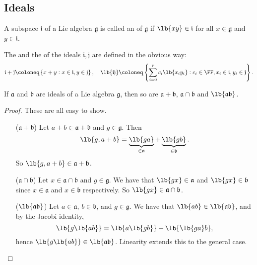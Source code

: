 \documentclass{article}
\DeclarePairedDelimiter\lb\lbrack\rbrack
\newcommand*\frka{{\ensuremath{\mathfrak{a}}}}
\newcommand*\frkb{{\ensuremath{\mathfrak{b}}}}
\newcommand*\frkg{{\ensuremath{\mathfrak{g}}}}
\newcommand*\frki{{\ensuremath{\mathfrak{i}}}}
\newcommand*\frkj{{\ensuremath{\mathfrak{j}}}}
\begin{document}
\subsection{Ideals}

\begin{definition}
    A subspace $\frki$ of a Lie algebra $\frkg$ is called an  of $\frkg$ if $\lb{xy} \in \frki$ for all $x \in \frkg$ and $y \in \frki$.
\end{definition}

The  and the  of the ideals $\frki, \frkj$ are defined in the obvious way:
\[
    \frki + \frkj
    \coloneq
    \left\{
        x + y : x \in \frki, y \in \frkj
    \right\},\quad
    \lb{\frki\frkj}
    \coloneq
    \left\{
        \sum_{i=0}^rc_i\lb{x_iy_i}
        :
        c_i \in \FF, x_i \in \frki, y_i \in \frkj
    \right\}.
\]

\begin{theorem}
    If $\frka$ and $\frkb$ are ideals of a Lie algebra $\frkg$, then so are $\frka + \frkb$, $\frka \cap \frkb$ and $\lb{\frka\frkb}$.
\end{theorem}
\begin{proof}
    These are all easy to show.
    \begin{itemize}
        \item[($\frka+\frkb$)]
            Let $a + b \in \frka + \frkb$ and $g \in \frkg$.
            Then
            \[
                \lb{g,a+b}
                =
                \underbrace{
                    \lb{ga}
                }_{\in \frka}
                +
                \underbrace{
                    \lb{gb}
                }_{\in \frkb}.
            \]
            So $\lb{g,a+b} \in \frka+\frkb$.
        \item[($\frka \cap \frkb$)]
            Let $x \in \frka \cap \frkb$ and $g \in \frkg$.
            We have that $\lb{gx} \in \frka$ and $\lb{gx} \in \frkb$ since $x \in \frka$ and $x \in \frkb$ respectively.
            So $\lb{gx} \in \frka \cap \frkb$.
        \item[($\lb{\frka\frkb}$)]
            Let $a \in \frka$, $b \in \frkb$, and $g \in \frkg$.
            We have that $\lb{ab} \in \lb{\frka\frkb}$, and by the Jacobi identity,
            \[
                \lb{g\lb{ab}}
                =
                \lb{a\lb{gb}}
                +
                \lb{\lb{ga}b},
            \]
            hence $\lb{g\lb{ab}} \in \lb{\frka\frkb}$.
            Linearity extends this to the general case.
    \end{itemize}
\end{proof}
\end{document}
